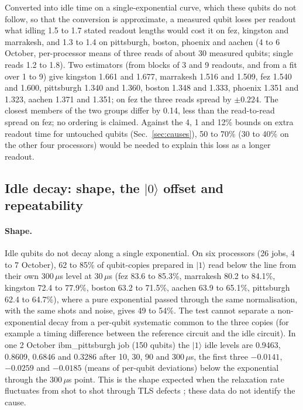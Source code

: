 \documentclass[reprint,amsmath,amssymb,aps,superscriptaddress,nofootinbib]{revtex4-2}
\newcommand{\us}{\,$\mu$s}
\begin{document}
Converted into idle time on a single-exponential curve, which these qubits do not follow, so that the conversion is approximate, a measured qubit loses per readout what idling 1.5 to 1.7 stated readout lengths would cost it on fez, kingston and marrakesh, and 1.3 to 1.4 on pittsburgh, boston, phoenix and aachen (4 to 6 October, per-processor means of three reads of about 30 measured qubits; single reads 1.2 to 1.8). Two estimators (from blocks of 3 and 9 readouts, and from a fit over 1 to 9) give kingston 1.661 and 1.677, marrakesh 1.516 and 1.509, fez 1.540 and 1.600, pittsburgh 1.340 and 1.360, boston 1.348 and 1.333, phoenix 1.351 and 1.323, aachen 1.371 and 1.351; on fez the three reads spread by $\pm0.224$. The closest members of the two groups differ by 0.14, less than the read-to-read spread on fez; no ordering is claimed. Against the 4, 1 and 12\% bounds on extra readout time for untouched qubits (Sec.~\ref{sec:causes}), 50 to 70\% (30 to 40\% on the other four processors) would be needed to explain this loss as a longer readout.

\subsection{Idle decay: shape, the $|0\rangle$ offset and repeatability}\label{sec:decay}

\paragraph*{Shape.} Idle qubits do not decay along a single exponential. On six processors (26 jobs, 4 to 7 October), 62 to 85\% of qubit-copies prepared in $|1\rangle$ read below the line from their own 300\us{} level at 30\us{} (fez 83.6 to 85.3\%, marrakesh 80.2 to 84.1\%, kingston 72.4 to 77.9\%, boston 63.2 to 71.5\%, aachen 63.9 to 65.1\%, pittsburgh 62.4 to 64.7\%), where a pure exponential passed through the same normalisation, with the same shots and noise, gives 49 to 54\%. The test cannot separate a non-exponential decay from a per-qubit systematic common to the three copies (for example a timing difference between the reference circuit and the idle circuit). In one 2 October ibm\_pittsburgh job (150 qubits) the $|1\rangle$ idle levels are 0.9463, 0.8609, 0.6846 and 0.3286 after 10, 30, 90 and 300\us, the first three $-0.0141$, $-0.0259$ and $-0.0185$ (means of per-qubit deviations) below the exponential through the 300\us{} point. This is the shape expected when the relaxation rate fluctuates from shot to shot through TLS defects \cite{Klimov2018,Schlor2019,Burnett2019,Carroll2022,Muller2019}; these data do not identify the cause.
\end{document}
